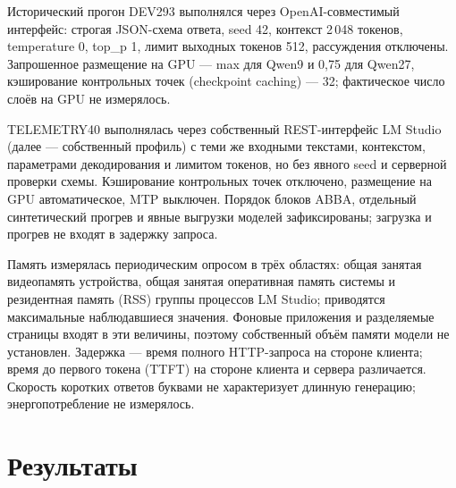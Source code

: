 \documentclass[14pt,a4paper]{extarticle}
\begin{document}
Исторический прогон DEV293 выполнялся через OpenAI-совместимый интерфейс: строгая JSON-схема ответа, seed 42, контекст 2\,048 токенов, temperature 0, top\_p 1, лимит выходных токенов 512, рассуждения отключены. Запрошенное размещение на GPU — max для Qwen9 и 0,75 для Qwen27, кэширование контрольных точек (checkpoint caching) — 32; фактическое число слоёв на GPU не измерялось.

TELEMETRY40 выполнялась через собственный REST-интерфейс LM Studio (далее — собственный профиль) с теми же входными текстами, контекстом, параметрами декодирования и лимитом токенов, но без явного seed и серверной проверки схемы. Кэширование контрольных точек отключено, размещение на GPU автоматическое, MTP выключен. Порядок блоков ABBA, отдельный синтетический прогрев и явные выгрузки моделей зафиксированы; загрузка и прогрев не входят в задержку запроса.

Память измерялась периодическим опросом в трёх областях: общая занятая видеопамять устройства, общая занятая оперативная память системы и резидентная память (RSS) группы процессов LM Studio; приводятся максимальные наблюдавшиеся значения. Фоновые приложения и разделяемые страницы входят в эти величины, поэтому собственный объём памяти модели не установлен. Задержка — время полного HTTP-запроса на стороне клиента; время до первого токена (TTFT) на стороне клиента и сервера различается. Скорость коротких ответов буквами не характеризует длинную генерацию; энергопотребление не измерялось.

\section*{Результаты}
\end{document}
